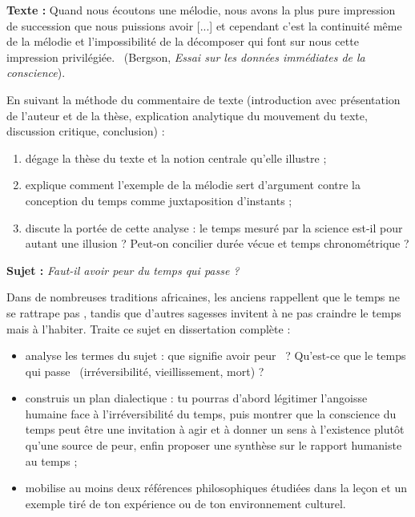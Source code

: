\documentclass[11pt]{article}
\begin{document}
\begin{exercice}
\textbf{Texte :} \guillemotleft Quand nous écoutons une mélodie, nous avons la plus pure impression de succession que nous puissions avoir [...] et cependant c'est la continuité même de la mélodie et l'impossibilité de la décomposer qui font sur nous cette impression privilégiée. \guillemotright\ (Bergson, \emph{Essai sur les données immédiates de la conscience}).

En suivant la méthode du commentaire de texte (introduction avec présentation de l'auteur et de la thèse, explication analytique du mouvement du texte, discussion critique, conclusion) :
\begin{enumerate}
\item dégage la thèse du texte et la notion centrale qu'elle illustre ;
\item explique comment l'exemple de la mélodie sert d'argument contre la conception du temps comme juxtaposition d'instants ;
\item discute la portée de cette analyse : le temps mesuré par la science est-il pour autant une illusion ? Peut-on concilier durée vécue et temps chronométrique ?
\end{enumerate}
\end{exercice}

\begin{exercice}
\textbf{Sujet :} \emph{Faut-il avoir peur du temps qui passe ?}

Dans de nombreuses traditions africaines, les anciens rappellent que \guillemotleft le temps ne se rattrape pas \guillemotright, tandis que d'autres sagesses invitent à ne pas craindre le temps mais à l'habiter. Traite ce sujet en dissertation complète :
\begin{itemize}
\item analyse les termes du sujet : que signifie \guillemotleft avoir peur \guillemotright\ ? Qu'est-ce que \guillemotleft le temps qui passe \guillemotright\ (irréversibilité, vieillissement, mort) ?
\item construis un plan dialectique : tu pourras d'abord légitimer l'angoisse humaine face à l'irréversibilité du temps, puis montrer que la conscience du temps peut être une invitation à agir et à donner un sens à l'existence plutôt qu'une source de peur, enfin proposer une synthèse sur le rapport humaniste au temps ;
\item mobilise au moins deux références philosophiques étudiées dans la leçon et un exemple tiré de ton expérience ou de ton environnement culturel.
\end{itemize}
\end{exercice}
\end{document}
